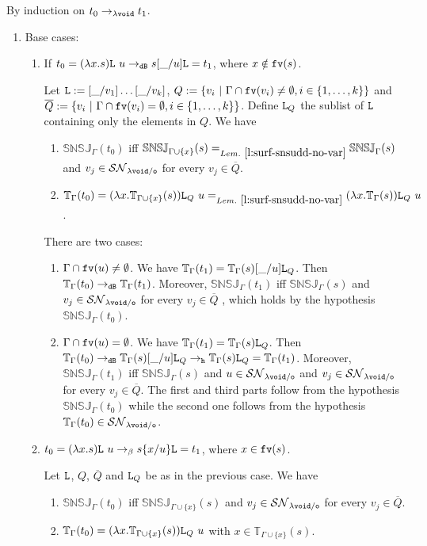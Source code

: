 \documentclass{LMCS}
\renewcommand{\>}{\rightarrow}
\def\lam{\lambda}
\def\Gam{\Gamma}
\newcommand{\Rew}[1]{\rightarrow_{#1}}
\newcommand{\isubs}[1]{ \{ #1  \} }
\newcommand{\SN}[1]{\mathcal{SN}_{#1}}
\newcommand{\B}{{\tt dB}}
\newcommand{\fv}[1]{{\tt fv}(#1)}
\newcommand{\set}[1]{ \{ #1 \}}
\newcommand{\ems}{\emptyset}
\newcommand{\modulo}[2]{#1/#2}
\newcommand{\osymb}{{\tt o}}
\newcommand{\aux}{{\tt void}}
\newcommand{\laux}{\lam\aux}
\newcommand{\lauxm}{\lam\modulo{ \aux }{ \osymb }}
\newcommand{\New}{{\tt h}}
\newcommand{\snsudd}[2]{\mathbb{SNSJ}_{#1}(#2)}
\newcommand{\List}{{\tt L}}
\newcommand{\surf}[2]{\mathbb{T}_{#1}(#2)}
\newcommand{\void}{\_}
\begin{document}
\proof
By induction on $t_0\Rew{\laux} t_1$.
\begin{enumerate}[$\bullet$]
\item Base cases:
\begin{enumerate}[$-$]
  \item If $t_0=(\lam x. s)\List\ u\Rew{\B} s [\void/u]\List = t_1$, where $x \notin \fv{s}$. 

Let $\List:=[\void/v_1]\ldots[\void/v_k]$,
$Q:=\set{v_i\ |\ \Gam\cap\fv{v_i}\neq\ems, i\in\set{1,\ldots,k}}$ and
$\overline{Q}:=\set{ v_i\ |\ \Gam\cap\fv{v_i}=\ems,
  i\in\set{1,\ldots,k}}$. Define $\List_Q$  the sublist of $\List$ containing only the elements in $Q$.  We have
\begin{enumerate}[$\star$]
  \item $\snsudd{\Gam}{t_0}$ iff $\snsudd{\Gam\cup\set{x}}{s} =_{Lem.~\ref{l:surf-snsudd-no-var}} \snsudd{\Gam}{s}$ and
    $v_j\in\SN{\lauxm}$ for every $v_j\in \overline{Q}$.
  \item $\surf{\Gam}{t_0}=(\lam x.\surf{\Gam\cup\set{x}}{s})\List_Q\ u=_{Lem.~\ref{l:surf-snsudd-no-var}}(\lam     x.\surf{\Gam}{s})\List_Q\ u$.
\end{enumerate}
There are two cases:
\begin{enumerate}[(1)]
  \item \emph{$\Gam\cap\fv{u}\neq\ems$}. We have
    $\surf{\Gam}{t_1}=\surf{\Gam}{s}[\void/u]\List_Q$. Then
    $\surf{\Gam}{t_0}\Rew{\B} \surf{\Gam}{t_1}$. Moreover,
    $\snsudd{\Gam}{t_1}$ iff $\snsudd{\Gam}{s}$ and $v_j\in\SN{\lauxm}$
    for every $v_j\in \overline{Q}$ , which holds by 
    the hypothesis $\snsudd{\Gam}{t_0}$.
\item \emph{$\Gam\cap\fv{u}=\ems$}. We have
  $\surf{\Gam}{t_1}=\surf{\Gam}{s}\List_Q$.  Then $\surf{\Gam}{t_0}\Rew{\B}
  \surf{\Gam}{s} [\void/u]\List_Q\Rew{\New}
  \surf{\Gam}{s}\List_Q=\surf{\Gam}{t_1}$.  Moreover, $\snsudd{\Gam}{t_1}$
  iff $\snsudd{\Gam}{s}$ and $u\in\SN{\lauxm}$ and $v_j\in\SN{\lauxm}$ for every $v_j\in
  \overline{Q}$. The first and third parts follow
from the hypothesis $\snsudd{\Gam}{t_0}$ while the second one follows from the hypothesis
  $\surf{\Gam}{t_0} \in \SN{\lauxm}$.
\end{enumerate}

  \item $t_0=(\lam x. s)\List\ u\Rew{\beta} s \isubs{x/u}\List= t_1$, where $x \in \fv{s}$.  

Let $\List$, $Q$, $\overline{Q}$ and $\List_{Q}$ be as in the previous case.
We have 
\begin{enumerate}[$\star$]
  \item $\snsudd{\Gam}{t_0}$ iff $\snsudd{\Gam\cup\set{x}}{s}$ and
    $v_j\in\SN{\lauxm}$ for every $v_j\in \overline{Q}$.
  \item $\surf{\Gam}{t_0}=(\lam x.\surf{\Gam\cup\set{x}}{s})\List_Q\ u$ with $x \in \surf{\Gam\cup\set{x}}{s}$.
\end{enumerate}


\end{enumerate}
\end{enumerate}
\end{document}
